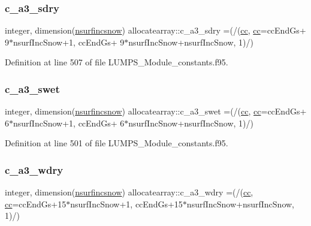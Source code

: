 \subsubsection{\texorpdfstring{c\+\_\+a3\+\_\+sdry}{c\_a3\_sdry}}
{\footnotesize\ttfamily integer, dimension(\hyperlink{namespaceallocatearray_af4d113f332b6759cfa22271140c9162d}{nsurfincsnow}) allocatearray\+::c\+\_\+a3\+\_\+sdry =(/(\hyperlink{namespaceallocatearray_ac863c81704eb507dee10f5e10741e10c}{cc}, \hyperlink{namespaceallocatearray_ac863c81704eb507dee10f5e10741e10c}{cc}=cc\+End\+Gs+ 9$\ast$nsurf\+Inc\+Snow+1, cc\+End\+Gs+ 9$\ast$nsurf\+Inc\+Snow+nsurf\+Inc\+Snow, 1)/)}



Definition at line 507 of file L\+U\+M\+P\+S\+\_\+\+Module\+\_\+constants.\+f95.

\mbox{\label{namespaceallocatearray_aa37a60646d2e216c6ef174a9d3d937e0}} 
\subsubsection{\texorpdfstring{c\+\_\+a3\+\_\+swet}{c\_a3\_swet}}
{\footnotesize\ttfamily integer, dimension(\hyperlink{namespaceallocatearray_af4d113f332b6759cfa22271140c9162d}{nsurfincsnow}) allocatearray\+::c\+\_\+a3\+\_\+swet =(/(\hyperlink{namespaceallocatearray_ac863c81704eb507dee10f5e10741e10c}{cc}, \hyperlink{namespaceallocatearray_ac863c81704eb507dee10f5e10741e10c}{cc}=cc\+End\+Gs+ 6$\ast$nsurf\+Inc\+Snow+1, cc\+End\+Gs+ 6$\ast$nsurf\+Inc\+Snow+nsurf\+Inc\+Snow, 1)/)}



Definition at line 501 of file L\+U\+M\+P\+S\+\_\+\+Module\+\_\+constants.\+f95.

\mbox{\label{namespaceallocatearray_a8bcd3cee05059ebc666f6d534190375c}} 
\subsubsection{\texorpdfstring{c\+\_\+a3\+\_\+wdry}{c\_a3\_wdry}}
{\footnotesize\ttfamily integer, dimension(\hyperlink{namespaceallocatearray_af4d113f332b6759cfa22271140c9162d}{nsurfincsnow}) allocatearray\+::c\+\_\+a3\+\_\+wdry =(/(\hyperlink{namespaceallocatearray_ac863c81704eb507dee10f5e10741e10c}{cc}, \hyperlink{namespaceallocatearray_ac863c81704eb507dee10f5e10741e10c}{cc}=cc\+End\+Gs+15$\ast$nsurf\+Inc\+Snow+1, cc\+End\+Gs+15$\ast$nsurf\+Inc\+Snow+nsurf\+Inc\+Snow, 1)/)}



